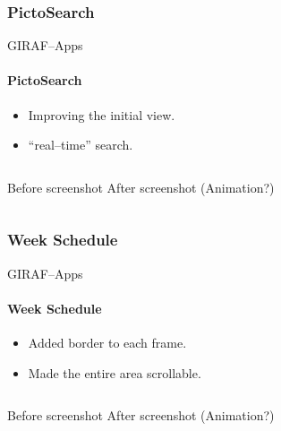         \subsubsection{PictoSearch}
            \begin{frame}[t]{GIRAF--Apps}\framesubtitle{PictoSearch}
                \begin{itemize}
                    \item Improving the initial view.
                    \item \enquote{real--time} search.
                \end{itemize}
                \bigskip
                \begin{columns}[c]
                        Before screenshot
                        After screenshot (Animation?)
                \end{columns}
            \end{frame}

        \subsubsection{Week Schedule}
            \begin{frame}[t]{GIRAF--Apps}\framesubtitle{Week Schedule}
                \begin{itemize}
                    \item Added border to each frame.
                    \item Made the entire area scrollable.
                \end{itemize}
                \bigskip
                \begin{columns}[c]
                        Before screenshot
                        After screenshot (Animation?)
                \end{columns}
            \end{frame}
